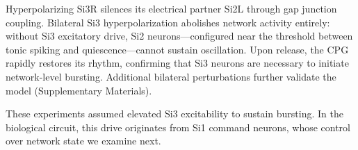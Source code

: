 Hyperpolarizing Si3R silences its electrical partner Si2L through gap junction coupling.
Bilateral Si3 hyperpolarization abolishes network activity entirely: without Si3 excitatory drive, Si2 neurons---configured near the threshold between tonic spiking and quiescence---cannot sustain oscillation.
Upon release, the CPG rapidly restores its rhythm, confirming that Si3 neurons are necessary to initiate network-level bursting.
Additional bilateral perturbations further validate the model (Supplementary Materials).

These experiments assumed elevated Si3 excitability to sustain bursting.
In the biological circuit, this drive originates from Si1 command neurons, whose control over network state we examine next.

